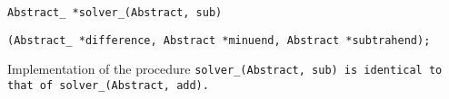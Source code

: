 
\s\tt{Abstract_ *solver_(Abstract, sub)}

\tt{(Abstract_ *difference, Abstract *minuend, Abstract *subtrahend);}


Implementation of the procedure \tt{solver_(Abstract, sub)}
is identical to that of \tt{solver_(Abstract, add)}.
